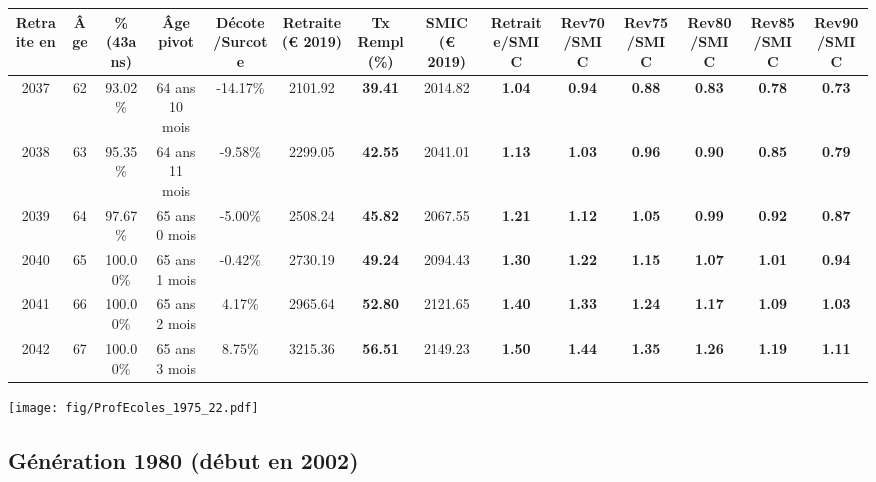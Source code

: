 \begin{adjustbox}{max width=\textwidth} 
\begin{tabular}[htb]{|c|c||c|c|c||c|c||c||c|c|c|c|c|c|} 
\hline 
 Retraite en &  Âge &  \%(43ans) &  Âge pivot &  Décote/Surcote &  Retraite (\euro{} 2019) &  Tx Rempl(\%) &  SMIC (\euro{} 2019) &  Retraite/SMIC &  Rev70/SMIC &  Rev75/SMIC &  Rev80/SMIC &  Rev85/SMIC &  Rev90/SMIC \\ 
\hline \hline 
 2037 &  62 &  93.02\% &  64 ans 10 mois &  -14.17\% &  2101.92 &  {\bf 39.41} &  2014.82 &  {\bf 1.04} &  {\bf {\color{red} 0.94}} &  {\bf {\color{red} 0.88}} &  {\bf {\color{red} 0.83}} &  {\bf {\color{red} 0.78}} &  {\bf {\color{red} 0.73}} \\ 
\hline 
 2038 &  63 &  95.35\% &  64 ans 11 mois &  -9.58\% &  2299.05 &  {\bf 42.55} &  2041.01 &  {\bf 1.13} &  {\bf 1.03} &  {\bf {\color{red} 0.96}} &  {\bf {\color{red} 0.90}} &  {\bf {\color{red} 0.85}} &  {\bf {\color{red} 0.79}} \\ 
\hline 
 2039 &  64 &  97.67\% &  65 ans 0 mois &  -5.00\% &  2508.24 &  {\bf 45.82} &  2067.55 &  {\bf 1.21} &  {\bf 1.12} &  {\bf 1.05} &  {\bf {\color{red} 0.99}} &  {\bf {\color{red} 0.92}} &  {\bf {\color{red} 0.87}} \\ 
\hline 
 2040 &  65 &  100.00\% &  65 ans 1 mois &  -0.42\% &  2730.19 &  {\bf 49.24} &  2094.43 &  {\bf 1.30} &  {\bf 1.22} &  {\bf 1.15} &  {\bf 1.07} &  {\bf 1.01} &  {\bf {\color{red} 0.94}} \\ 
\hline 
 2041 &  66 &  100.00\% &  65 ans 2 mois &  4.17\% &  2965.64 &  {\bf 52.80} &  2121.65 &  {\bf 1.40} &  {\bf 1.33} &  {\bf 1.24} &  {\bf 1.17} &  {\bf 1.09} &  {\bf 1.03} \\ 
\hline 
 2042 &  67 &  100.00\% &  65 ans 3 mois &  8.75\% &  3215.36 &  {\bf 56.51} &  2149.23 &  {\bf 1.50} &  {\bf 1.44} &  {\bf 1.35} &  {\bf 1.26} &  {\bf 1.19} &  {\bf 1.11} \\ 
\hline 
\hline 
\end{tabular} 
\end{adjustbox} 
 
 \vspace{0.1cm} 

 \begin{center}\texttt{[image: fig/ProfEcoles\_1975\_22.pdf]}\end{center} \label{fig/ProfEcoles_1975_22.pdf} 

\newpage 
 
\subsection{Génération 1980 (début en 2002)} 

